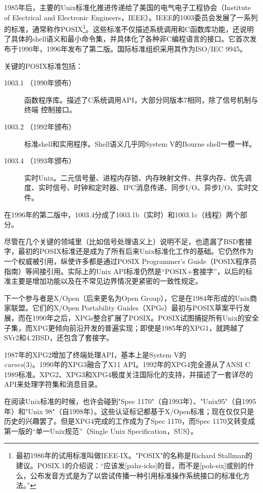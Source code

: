 \documentclass[12pt,oneside]{book}
\begin{document}
1985年后，主要的Unix标准化推进传递给了美国的电气电子工程协会（Institute of Electrical and Electronic Engineers，IEEE）。IEEE的1003委员会发展了一系列的标准，通常称作POSIX\footnote{最初1986年的试用标准叫做IEEE-IX。"POSIX"的名称是Richard Stallman的建议。POSIX.1的介绍说：“应该发[pahz-icks]的音，而不是[poh-six]或别的什么，公布发音方式是为了以尝试传播一种引用标准操作系统接口的标准化方法。”}。这些标准不仅描述系统调用和C函数库功能，还说明了具体的shell语义和最小命令集，并具体化了各种非C编程语言的接口。它首次发布于1990年，1996年发布了第二版。国际标准组织采用其作为ISO/IEC 9945。

关键的POSIX标准包括：
\begin{description}
\item[1003.1 （1990年颁布）] 函数程序库。描述了C系统调用API，大部分同版本7相同，除了信号机制与终端
控制接口。
\item[1003.2 （1992年颁布）] 标准shell和实用程序。Shell语义几乎同System V的Bourne shell一模一样。
\item[1003.4 （1993年颁布）] 实时Unix。二元信号量、进程内存锁、内存映射文件、共享内存、优先调度、实时信号、时钟和定时器、IPC消息传递、同步I/O、异步I/O、实时文件。
\end{description}

在1996年的第二版中，1003.4分成了1003.1b（实时）和1003.1c（线程）两个部分。

尽管在几个关键的领域里（比如信号处理语义上）说明不足，也遗漏了BSD套接字，最初的POSIX标准还是成为了所有后来Unix标准化工作的基础。它仍然作为一个权威被引用，纵使许多都是通过POSIX Programmer's Guide（POSIX程序员指南）\cite{Lewine}等间接引用。实际上的Unix API标准仍然是“POSIX+套接字”，以后的标准主要是增加功能以及在不常见边界情况更紧密的一致性规定。

下一个参与者是X/Open（后来更名为Open Group），它是在1984年形成的Unix商家联盟。它们的X/Open Portability Guides（XPGs）最初与POSIX草案平行发展，而在1990年之后，XPGs整合扩展了POSIX。POSIX试图捕捉所有Unix的安全子集，而XPG更倾向前沿开发的普遍实现；即使是1985年的XPG1，就跨越了SVr2和4.2BSD，还包含了套接字。

1987年的XPG2增加了终端处理API，基本上是System V的\\ \textit{curses}(3)。1990年的XPG3融合了X11 API。1992年的XPG4完全遵从了ANSI C 1989标准。XPG2、XPG3和XPG4极度关注国际化的支持，并描述了一套详尽的API来处理字符集和消息目录。

在阅读Unix标准的时候，也许会碰到"Spec 1170"（自1993年）、"Unix95"（自1995年）和"Unix 98"（自1998年）。这些认证标记都基于X/Open标准；现在仅仅只是历史的兴趣罢了。但是XPG4完成的工作成为了Spec 1170，而Spec 1170又转变成第一版的“单一Unix规范”（Single Unix Specification，SUS）。
\end{document}
